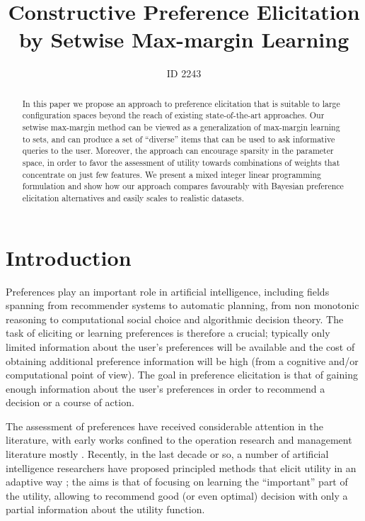 \documentclass{article}
\title{Constructive Preference Elicitation by Setwise Max-margin Learning} %
\author{ID 2243}
\renewcommand\[{\begin{equation}}
\renewcommand\]{\end{equation}}
\begin{document}
\maketitle

\begin{abstract}
  In this paper we propose an approach to preference elicitation that
  is suitable to large configuration spaces beyond the reach of
  existing state-of-the-art approaches. Our setwise max-margin method
  can be viewed as a generalization of max-margin learning to sets,
  and can produce a set of ``diverse'' items that can be used to ask
  informative queries to the user.  Moreover, the approach can
  encourage sparsity in the parameter space, in order to favor the
  assessment of utility towards combinations of weights that
  concentrate on just few features.  We present a mixed integer linear
  programming formulation and show how our approach compares
  favourably with Bayesian preference elicitation alternatives and
  easily scales to realistic datasets.
\end{abstract}

\section{Introduction}

Preferences \cite{Peintner2008} play an important role in artificial intelligence,
including fields spanning from recommender systems to automatic planning, 
from non monotonic reasoning to computational social choice and algorithmic decision theory.
The task of eliciting or learning preferences is therefore a crucial; typically only limited information about the user's preferences will be available and the cost of obtaining additional preference information will be high (from a cognitive and/or computational point of view).
The goal in preference elicitation is that of gaining enough information about the user's preferences %
in order to recommend a decision or a course of action.

The assessment of preferences have received considerable attention in the literature, with early works confined to the operation research and management literature mostly \cite{White1984,JacquetLagreze95}.
Recently, in the last decade or so, a number of artificial intelligence researchers have proposed principled methods that elicit utility in an adaptive way \cite{chajewska2000,boutilier2002,Wang2003,boutilier2006,braziunas2007,guo2010real,viappiani2010optimal}; the aims is that of focusing on learning the ``important'' part of the utility, allowing to recommend good (or even optimal) decision with only a partial information about the utility function.
\end{document}

